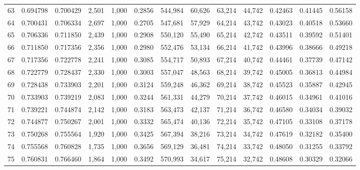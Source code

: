 \begin{tabular}{rrrrrrrrrrrrr}
63  &  0.694798 &  0.700429 &   2,501 &  1,000 &                                     0.2856 &  544,984 &   60,626 &   63,214 &   44,742 &  0.42463 &  0.41445 &  0.56158 \\
64  &  0.700431 &  0.706334 &   2,697 &  1,000 &                                     0.2705 &  547,681 &   57,929 &   64,214 &   43,742 &  0.43023 &  0.40518 &  0.53660 \\
65  &  0.706336 &  0.711850 &   2,439 &  1,000 &                                     0.2908 &  550,120 &   55,490 &   65,214 &   42,742 &  0.43511 &  0.39592 &  0.51401 \\
66  &  0.711850 &  0.717356 &   2,356 &  1,000 &                                     0.2980 &  552,476 &   53,134 &   66,214 &   41,742 &  0.43996 &  0.38666 &  0.49218 \\
67  &  0.717356 &  0.722778 &   2,241 &  1,000 &                                     0.3085 &  554,717 &   50,893 &   67,214 &   40,742 &  0.44461 &  0.37739 &  0.47142 \\
68  &  0.722779 &  0.728437 &   2,330 &  1,000 &                                     0.3003 &  557,047 &   48,563 &   68,214 &   39,742 &  0.45005 &  0.36813 &  0.44984 \\
69  &  0.728438 &  0.733903 &   2,201 &  1,000 &                                     0.3124 &  559,248 &   46,362 &   69,214 &   38,742 &  0.45523 &  0.35887 &  0.42945 \\
70  &  0.733903 &  0.739219 &   2,083 &  1,000 &                                     0.3244 &  561,331 &   44,279 &   70,214 &   37,742 &  0.46015 &  0.34961 &  0.41016 \\
71  &  0.739221 &  0.744874 &   2,142 &  1,000 &                                     0.3183 &  563,473 &   42,137 &   71,214 &   36,742 &  0.46580 &  0.34034 &  0.39032 \\
72  &  0.744877 &  0.750267 &   2,001 &  1,000 &                                     0.3332 &  565,474 &   40,136 &   72,214 &   35,742 &  0.47105 &  0.33108 &  0.37178 \\
73  &  0.750268 &  0.755564 &   1,920 &  1,000 &                                     0.3425 &  567,394 &   38,216 &   73,214 &   34,742 &  0.47619 &  0.32182 &  0.35400 \\
74  &  0.755568 &  0.760828 &   1,735 &  1,000 &                                     0.3656 &  569,129 &   36,481 &   74,214 &   33,742 &  0.48050 &  0.31255 &  0.33792 \\
75  &  0.760831 &  0.766460 &   1,864 &  1,000 &                                     0.3492 &  570,993 &   34,617 &   75,214 &   32,742 &  0.48608 &  0.30329 &  0.32066 \\

\end{tabular}
